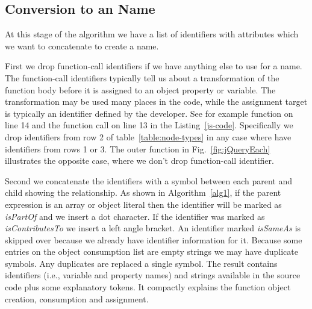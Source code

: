 \documentclass[10pt, preprint]{sigplanconf}
\begin{document}
\begin{table}
\centering
{}
\caption{JavaScript Expression Reduction to a Name. Expressions which match an entry in the pattern column are converted as shown in the Name column. Here \texttt{e} indicates an expression, \texttt{id} indicates an identifier, \texttt{+} means string concatenation and \texttt{Name()} means we apply the pattern matching recursively.}
\label{expression-reduction} 
\end{table}    

\subsection{Conversion to an Name}
\label{sec:concatenation}
At this stage of the algorithm we have a list of identifiers with attributes which we want to concatenate to create a name. 

First we drop function-call identifiers if we have anything else to use for a name. The function-call identifiers typically tell us about a transformation of the function body before it is assigned to an object property or variable. The transformation may be used many places in the code, while the assignment target is typically an identifier defined by the developer.  See for example function on line 14 and the function call on line 13 in the Listing~\ref{js-code}. Specifically we drop identifiers from row 2 of table~\ref{table:node-types} in any case where have identifiers from rows 1 or 3.  The outer function in Fig.~\ref{fig:jQueryEach} illustrates the opposite case, where we don't drop function-call identifier. 
 
Second we concatenate the identifiers with a symbol between each parent and child showing the relationship.  As shown in Algorithm~\ref{alg1},  
if the parent expression is an array or object literal then the identifier will be marked  as \textit{isPartOf} and we insert a dot character. If the identifier was marked as  \textit{isContributesTo} we insert a left angle bracket. An identifier marked \textit{isSameAs} is skipped over because we already have identifier information for it. Because some entries on the object consumption list are empty strings we may have duplicate symbols. Any duplicates are replaced a single symbol. The result contains identifiers (i.e., variable and property names) and strings available in the source code plus some explanatory tokens. It compactly explains the function object creation, consumption and assignment.
 
\end{document}

